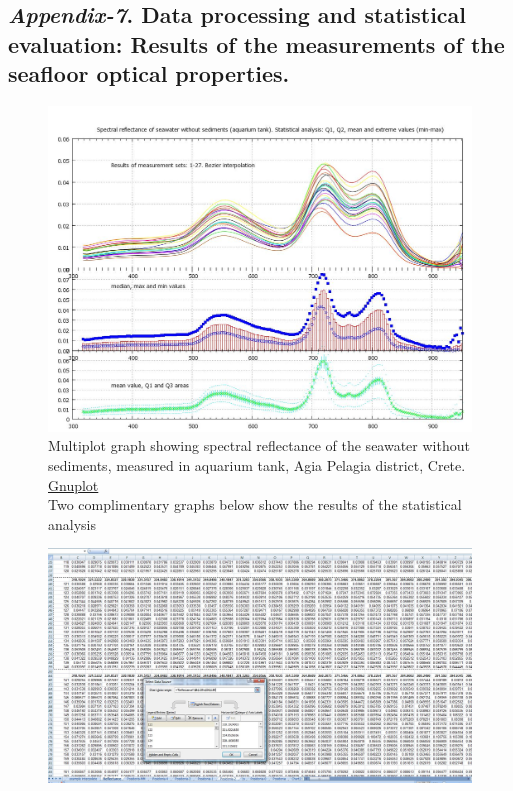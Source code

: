\documentclass[11pt]{article}
\begin{document}
\begin{appendices}
\subsection{\textit{Appendix-7}. Data processing and statistical evaluation: Results of the measurements of the seafloor optical properties.}

\begin{figure}[H]
	\centering
	\includegraphics[scale=0.30]{GNU-21.jpg}
	\caption{Multiplot graph showing spectral reflectance of the seawater without sediments, measured in aquarium tank, Agia Pelagia district, Crete. \href{http://www.gnuplot.info/}{Gnuplot} \\Two complimentary graphs below show the results of the statistical analysis}
	\label{fig:27}
\end{figure}
\begin{figure}[h]
	\begin{center}
		\includegraphics[scale=0.20]{App-1.jpg}

\end{center}
\end{figure}
\end{appendices}
\end{document}
